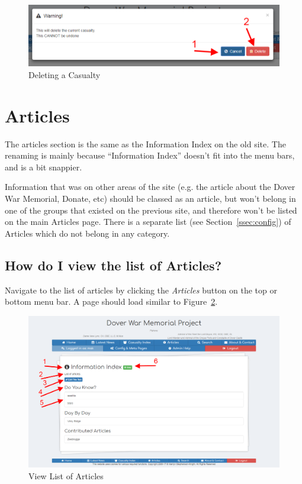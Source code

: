 \documentclass[12pt]{article}
\begin{document}
\begin{figure}[h]
  \centering
 \includegraphics[width=.9\textwidth]{pics/delete_casualty.png}
	\caption{Deleting a Casualty}\label{fig:delete_casualty}
\end{figure}

\newpage
\FloatBarrier
\section{Articles}\label{sec:articles}
The articles section is the same as the Information Index on the old site. The renaming is mainly because ``Information Index'' doesn't fit into the menu bars, and is a bit snappier.

Information that was on other areas of the site (e.g. the article about the Dover War Memorial, Donate, etc) should be classed as an article, but won't belong in one of the groups that existed on the previous site, and therefore won't be listed on the main Articles page. There is a separate list (see Section~\ref{ssec:config}) of Articles which do not belong in any category.

\subsection{How do I view the list of Articles?}\label{ssec:view_articles}
Navigate to the list of articles by clicking the \textit{Articles} button on the top or bottom menu bar. A page should load similar to Figure~\ref{fig:view_articles}.

\begin{figure}[h]
  \centering
 \includegraphics[width=.9\textwidth]{pics/view_articles.png}
	\caption{View List of Articles}\label{fig:view_articles}
\end{figure}
\end{document}
